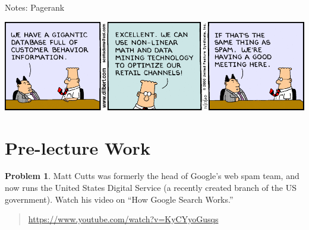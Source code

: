 \documentclass[10pt]{article}
\theoremstyle{definition}
\newtheorem{problem}{Problem}
\begin{document}
\begin{center}
\Huge
Notes: Pagerank
\end{center}

\begin{center}
\includegraphics[width=\textwidth]{dilbert}
\end{center}

\section{Pre-lecture Work}

\begin{problem}
    Matt Cutts was formerly the head of Google's web spam team,
    and now runs the United States Digital Service (a recently created branch of the US government).
    Watch his video on ``How Google Search Works.''
    \begin{quote}
    \url{https://www.youtube.com/watch?v=KyCYyoGusqs}
    \end{quote}
\end{problem}
\end{document}
